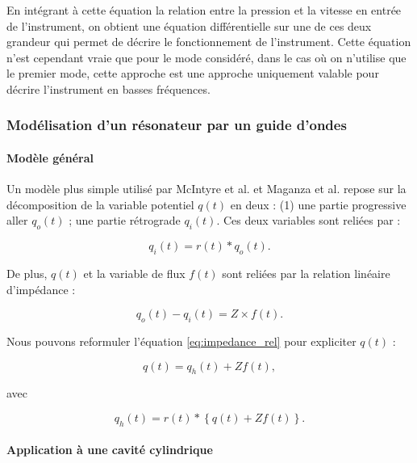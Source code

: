 \documentclass[atiam, article]{rapport} %
\begin{document}
En intégrant à cette équation la relation entre la pression et la vitesse en entrée de l'instrument, on obtient une équation différentielle sur une de ces deux grandeur qui permet de décrire le fonctionnement de l'instrument. Cette équation n'est cependant vraie que pour le mode considéré, dans le cas où on n'utilise que le premier mode, cette approche est une approche uniquement valable pour décrire l'instrument en basses fréquences. 


\subsubsection{Modélisation d'un résonateur par un guide d'ondes}

\paragraph{Modèle général}\label{sec:guide}

Un modèle plus simple utilisé par McIntyre et al. \cite{mcintyre_oscillations_1983} et Maganza et al. \cite{maganza_bifurcations_1986} repose sur la décomposition de la variable potentiel $q(t)$ en deux : (1) une partie progressive aller $q_o(t)$ ; une partie rétrograde $q_i(t)$. Ces deux variables sont reliées par :

\begin{equation}
    q_i(t)=r(t)*q_o(t).
\end{equation}

De plus, $q(t)$ et la variable de flux $f(t)$ sont reliées par la relation linéaire d'impédance :

\begin{equation}
    q_o(t) - q_i(t) = Z\times f(t).
    \label{eq:impedance_rel}
\end{equation}

Nous pouvons reformuler l'équation \ref{eq:impedance_rel} pour expliciter $q(t)$ :

\begin{equation}
    q(t) = q_h(t) + Zf(t), 
\end{equation}

avec

\begin{equation}
    q_h(t)=r(t)*\left\{q(t)+Zf(t)\right\}.
\end{equation}

 
\paragraph{Application à une cavité cylindrique}
\end{document}
